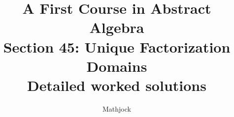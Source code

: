 
\title{\textbf{A First Course in Abstract Algebra}\\[0.3em]Section 45: Unique Factorization Domains\\[0.3em]\large Detailed worked solutions}
\author{Mathjock}
\date{}

\maketitle
\bookinfo
\tableofcontents
\clearpage
\renewcommand{\thesection}{45}
\renewcommand{\theHsection}{fraleigh.45}


